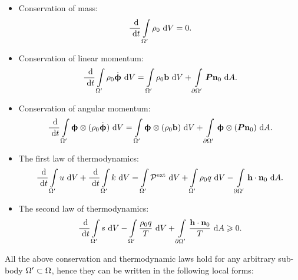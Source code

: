 \begin{itemize}
  \item Conservation of mass:
        \begin{align}
          \dfrac{\text{ d}}{\text{ d}t} \int\limits_{\Omega'} \rho_0 \text{ d}V = 0.
        \end{align}
  \item Conservation of linear momentum:
        \begin{align}
          \dfrac{\text{ d}}{\text{ d}t} \int\limits_{\Omega'} \rho_0 \dot{\boldsymbol{\upphi}} \text{ d}V = \int\limits_{\Omega'} \rho_0 \textbf{b} \text{ d}V + \int\limits_{{\partial \Omega}'} \boldsymbol{P}\textbf{n}_0 \text{ d}A.
        \end{align}
  \item Conservation of angular momentum:
        \begin{align}
          \dfrac{\text{ d}}{\text{ d}t} \int\limits_{\Omega'} \boldsymbol{\upphi} \otimes (\rho_0 \dot{\boldsymbol{\upphi}}) \text{ d}V = \int\limits_{\Omega'} \boldsymbol{\upphi} \otimes (\rho_0 \textbf{b}) \text{ d}V + \int\limits_{{\partial \Omega}'} \boldsymbol{\upphi} \otimes (\boldsymbol{P}\textbf{n}_0) \text{ d}A.
        \end{align}
  \item The first law of thermodynamics:
        \begin{equation}
          \begin{aligned}
            \dfrac{\text{ d}}{\text{ d}t} \int\limits_{\Omega'} u \text{ d}V + \dfrac{\text{ d}}{\text{ d}t} \int\limits_{\Omega'} k \text{ d}V = \int\limits_{\Omega'} \mathcal{P}^\text{ext} \text{ d}V + \int\limits_{\Omega'} \rho_0 q \text{ d}V - \int\limits_{{\partial \Omega}'} \textbf{h} \cdot \textbf{n}_0 \text{ d}A.
          \end{aligned}
        \end{equation}
  \item The second law of thermodynamics:
        \begin{align}
          \dfrac{\text{ d}}{\text{ d}t} \int\limits_{\Omega'} s \text{ d}V - \int\limits_{\Omega'} \dfrac{\rho_0 q}{T} \text{ d}V + \int\limits_{{\partial \Omega}'} \dfrac{\textbf{h} \cdot \textbf{n}_0}{T} \text{ d}A \geqslant 0.
        \end{align}
\end{itemize}
All the above conservation and thermodynamic laws hold for any arbitrary sub-body $\Omega' \subset \Omega$, hence they can be written in the following local forms:
